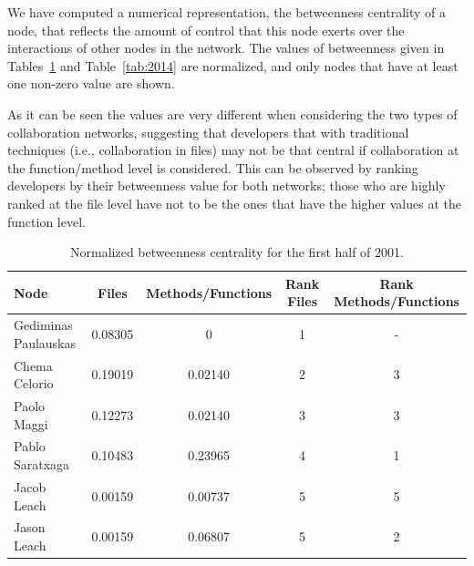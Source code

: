 \documentclass[a4paper]{article}
\begin{document}
We have computed a numerical representation, the betweenness centrality of a node,
that reflects the amount of control that
this node exerts over the interactions of other nodes in the network. 
The values of betweenness given in Tables~\ref{tab:2001} and Table~\ref{tab:2014} 
are normalized, and only nodes that have at least one non-zero value are shown.

As it can be seen the values are very different when considering the two types
of collaboration networks, suggesting that developers that with traditional
techniques (i.e., collaboration in files) may not be that central if collaboration
at the function/method level is considered. This can be observed by ranking 
developers by their betweenness value for both networks; those who are highly
ranked at the file level have not to be the ones that have the higher values
at the function level.

\begin{table}[ht]
\begin{center}
\caption{Normalized betweenness centrality for the first half of 2001.}
\label{tab:2001}
\bigskip
\begin{tabular}{|l|c|c|c|c|}
\hline
Node & Files & Methods/Functions & Rank Files & Rank Methods/Functions \\ \hline
Gediminas Paulauskas & 0.08305 & 0 & 1 & - \\
Chema Celorio & 0.19019 & 0.02140 & 2 & 3 \\ 
Paolo Maggi & 0.12273 & 0.02140 & 3 & 3 \\
Pablo Saratxaga & 0.10483 & 0.23965 & 4 & 1 \\
Jacob Leach & 0.00159 & 0.00737 & 5 & 5 \\
Jason Leach & 0.00159 & 0.06807 & 5 & 2 \\
\hline
\end{tabular}
\end{center}
\end{table}
\end{document}
